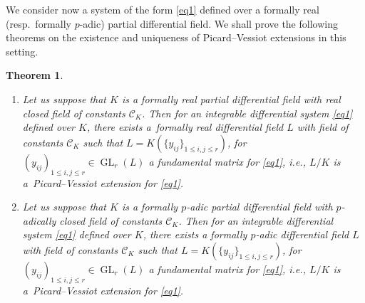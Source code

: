 \documentclass[pdftex]{sigma}%
\numberwithin{equation}{section}
\newtheorem{Theorem}{Theorem}[section]
\def \GL{\operatorname{GL}}
\begin{document}
We consider now a system of the form \eqref{eq1} defined over a formally real (resp.\ formally $p$-adic) partial differential field. We shall prove the following theorems on the existence and uniqueness of Picard--Vessiot extensions in this setting.

\begin{Theorem} \quad
\begin{enumerate}\itemsep=0pt
\item[$1.$] Let us suppose that $K$ is a formally real partial differential field with real closed field of constants $\mathcal{C}_K$. Then for an integrable differential system \eqref{eq1} defined over $K$, there exists a~formally real differential field $L$ with field of constants $\mathcal{C}_K$ such that $L=K(\{y_{ij}\}_{1\leq i,j\leq r})$, for~$(y_{ij})_{1\leq i,j\leq r}\in \GL_r(L)$ a fundamental matrix for \eqref{eq1}, i.e., $L/K$ is a~Picard--Vessiot extension for \eqref{eq1}.
\item[$2.$] Let us suppose that $K$ is a formally $p$-adic partial differential field with $p$-adically closed field of constants $\mathcal{C}_K$. Then for an integrable differential system \eqref{eq1} defined over $K$, there exists a formally $p$-adic differential field $L$ with field of constants $\mathcal{C}_K$ such that $L=K(\{y_{ij}\}_{1\leq i,j\leq r})$, for $(y_{ij})_{1\leq i,j\leq r}\in \GL_r(L)$ a fundamental matrix for \eqref{eq1}, i.e., $L/K$ is a~Picard--Vessiot extension for \eqref{eq1}.
\end{enumerate}
\end{Theorem}
\end{document}
